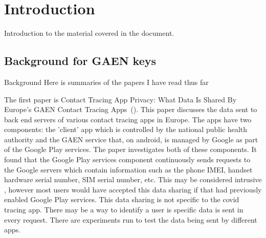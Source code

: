 \chapter{Introduction}

Introduction to the material covered in the document.

\section{Background for GAEN keys}
\label{sec:Background}

Background
Here is summaries of the papers I have read thus far

The first paper is Contact Tracing App Privacy: What Data Is Shared
By Europe’s GAEN Contact Tracing Apps~(\cite{9488728}). This paper discusses the data sent to back end servers of various contact tracing apps in Europe. The apps have two components: the 'client' app which is controlled by the national public health authority and the GAEN service that, on android, is managed by Google as part of the Google Play services. The paper investigates both of these components. It found that the Google Play services component continuously sends requests to the Google servers which contain information such as the phone IMEI, handset hardware serial number, SIM serial number, etc. This may be considered intrusive , however most users would have accepted this data sharing if that had previously enabled Google Play services. This data sharing is not specific to the covid tracing app. There may be a way to identify a user is  specific data is sent in every request. There are experiments run to test the data being sent by different apps. 

